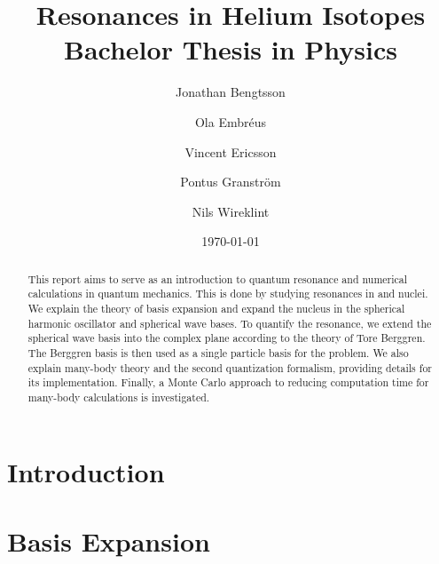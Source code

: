 \documentclass[12pt,a4paper]{report}
\begin{document}
  

\listoftodos


\title{Resonances in Helium Isotopes\\ 
\Large Bachelor Thesis in Physics}
\author{Jonathan Bengtsson  \and Ola Embréus \and Vincent Ericsson \and Pontus Granström \and Nils Wireklint}
\date{\today}



\maketitle

\newpage
\begin{abstract}
This report aims to serve as an introduction to quantum resonance and 
numerical calculations in quantum mechanics. This is done by studying
resonances in  and  nuclei. We explain the theory of basis
expansion and expand the  nucleus in the spherical harmonic oscillator
and spherical wave bases. To quantify the  resonance, we extend the
spherical wave basis into the complex plane according to the 
theory of Tore Berggren. The Berggren basis is then used as a single particle
basis for the  problem. We also explain many-body theory and the second
quantization formalism, providing details for its implementation. Finally, a
Monte Carlo approach to reducing computation time for many-body 
calculations is investigated.

\end{abstract}
\newpage


\tableofcontents
\newpage

\setcounter{page}{1}

\chapter{Introduction}
\label{cha:introduction}



\chapter{Basis Expansion}
\label{cha:basis expansion}

\end{document}
